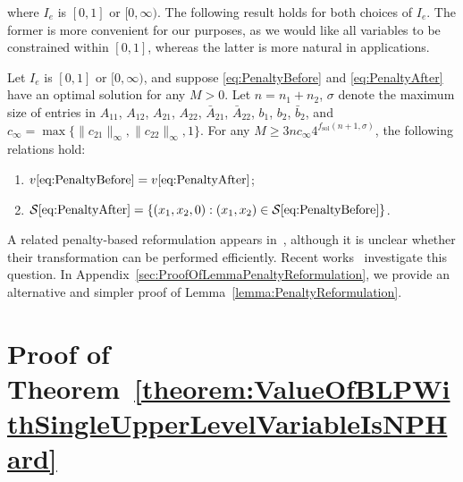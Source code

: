 \documentclass[runningheads,orivec]{llncs}
\newif\ifIPCOFlag
\newcommand{\IPCO}[2]{\ifIPCOFlag#1\else#2\fi}
\newcommand{\MacroColor}[1]{#1}
\newcommand{\NVariables}{\MacroColor{n}}
\newcommand{\OptValFunc}{\MacroColor{v}}
\newcommand{\OptSolSet}{\MacroColor{\mathcal{S}}}
\newcommand{\SolutionSizeEstimate}{\MacroColor{f_{\mathrm{sol}}}}
\newcommand{\ReformPen}{\MacroColor{e}}
\newcommand{\EncodingSize}{size}
\begin{document}
where $I_{\ReformPen}$ is $[0, 1]$ or $[0, \infty)$.
The following result holds for both choices of $I_{\ReformPen}$.
The former is more convenient for our purposes, as we would like all variables to be constrained within $[0, 1]$, whereas the latter is more natural in applications.
\begin{lemma}
\label{lemma:PenaltyReformulation}
Let $I_{\ReformPen}$ is $[0, 1]$ or $[0, \infty)$, and suppose \eqref{eq:PenaltyBefore} and \eqref{eq:PenaltyAfter} have an optimal solution for any $M > 0$.
Let $\NVariables = \NVariables_1 + \NVariables_2$, $\sigma$ denote the maximum \EncodingSize{} of entries in $A_{1 1}$, $A_{1 2}$, $A_{2 1}$, $A_{2 2}$, $\bar{A}_{2 1}$, $\bar{A}_{2 2}$, $b_1$, $b_2$, $\bar{b}_2$, and $c_{\infty} = \max\{ \| c_{2 1} \|_{\infty}, \| c_{2 2} \|_{\infty}, 1 \}$.
For any $M \ge 3 \NVariables c_{\infty} 4^{\SolutionSizeEstimate(\NVariables + 1, \sigma)}$, the following relations hold:
\begin{enumerate}
\item $\OptValFunc\eqref{eq:PenaltyBefore} = \OptValFunc\eqref{eq:PenaltyAfter}$;
\item $\OptSolSet\eqref{eq:PenaltyAfter} = \{(x_1, x_2, 0) : (x_1, x_2) \in \OptSolSet\eqref{eq:PenaltyBefore} \}$.
\end{enumerate}
\end{lemma}
\label{Rev:AugmentedLagrangian}
A related penalty-based reformulation appears in~\cite{henke2025coupling}, although it is unclear whether their transformation can be performed efficiently.
Recent works~\cite{henke2025couplingpessimistic,lefebvre2024exact} investigate this question.
In \IPCO{the full version of the paper~\cite{sugishita2025complexitybilevellinearprogramming}}{Appendix~\ref{sec:ProofOfLemmaPenaltyReformulation}}, we provide an alternative and simpler proof of Lemma~\ref{lemma:PenaltyReformulation}.

\section{Proof of Theorem~\ref{theorem:ValueOfBLPWithSingleUpperLevelVariableIsNPHard}}
\label{sec:ProofOfTheorem1}
\end{document}
